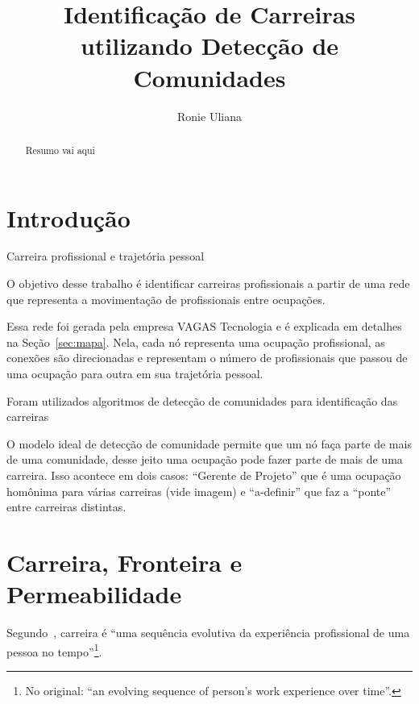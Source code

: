 \documentclass[
  article,
  11pt,
  a4paper,
  english,
  brazil,
  sumario=tradicional]{abntex2}
\title{Identificação de Carreiras utilizando Detecção de Comunidades}
\author{Ronie Uliana}
\begin{document}

\frenchspacing

\maketitle

\begin{abstract}
Resumo vai aqui
\end{abstract}

\section{Introdução}

Carreira profissional e trajetória pessoal

O objetivo desse trabalho é identificar carreiras profissionais a partir de uma rede que representa a movimentação de profissionais entre ocupações.

Essa rede foi gerada pela empresa VAGAS Tecnologia e é explicada em detalhes na Seção~\ref{sec:mapa}. Nela, cada nó representa uma ocupação profissional, as conexões são direcionadas e representam o número de profissionais que passou de uma ocupação para outra em sua trajetória pessoal.



Foram utilizados algoritmos de detecção de comunidades para identificação das carreiras

O modelo ideal de detecção de comunidade permite que um nó faça parte de mais de uma comunidade, desse jeito uma ocupação pode fazer parte de mais de uma carreira. Isso acontece em dois casos: \enquote{Gerente de Projeto} que é uma ocupação homônima para várias carreiras (vide imagem) e \enquote{a-definir} que faz a \enquote{ponte} entre carreiras distintas.

\section{Carreira, Fronteira e Permeabilidade} \label{sec:carreira}

Segundo~, carreira é \foreignquote{english}{uma sequência evolutiva da experiência profissional de uma pessoa no tempo}\footnote{No original: \enquote{an evolving sequence of person's work experience over time}.}.
\end{document}
